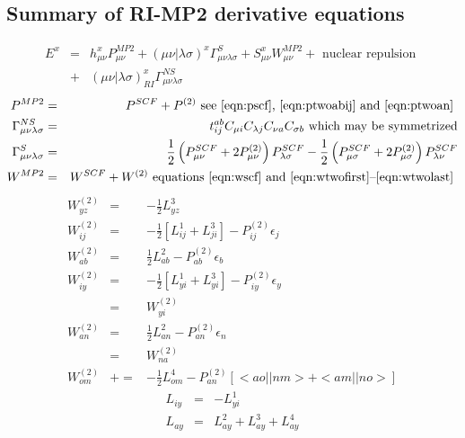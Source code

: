 \documentclass[fleqn,12pt]{article}
\newcommand{\half}{\frac{1}{2}}
\newcommand{\bra}{<\!}
\newcommand{\ket}{\!>}
\newcommand{\tijab}{{t_{ij}^{ab}}}
\newcommand{\Ptwo}{P^{(2)}}
\newcommand{\Wtwo}{W^{(2)}}
\newcommand{\intmri}[2]{( #1 | #2 )_{RI}}
\begin{document}
\begin{changebar}
\section{Summary of RI-MP2 derivative equations}
\begin{eqnarray}
  E^x & = & h^x_{\mu \nu} P^{MP2}_{\mu \nu}
     + (\mu \nu | \lambda \sigma)^x \Gamma^{S}_{\mu \nu \lambda \sigma}
     + S^x_{\mu \nu} W^{MP2}_{\mu \nu} + \mbox{ nuclear repulsion } \\
& + & \intmri{\mu\nu}{\lambda\sigma}^{x} \Gamma^{NS}_{\mu \nu \lambda
     \sigma} \nonumber
\end{eqnarray}
\begin{eqnarray}
  P^{MP2} & = & P^{SCF} + \Ptwo \mbox{ see \ref{eqn:pscf},
    \ref{eqn:ptwoabij} and \ref{eqn:ptwoan} } \\ 
  \Gamma^{NS}_{\mu \nu \lambda \sigma} & = & \tijab C_{\mu i}
  C_{\lambda j} C_{\nu a} C_{\sigma b} \mbox{ which may be
    symmetrized} \\
  \Gamma^{S}_{\mu \nu \lambda \sigma} & = &   
  \half\left(P^{SCF}_{\mu\nu} + 2 \Ptwo_{\mu\nu}\right)
  P^{SCF}_{\lambda\sigma} -  
  \half \left(P^{SCF}_{\mu\sigma} + 2 \Ptwo_{\mu\sigma}
  \right)P^{SCF}_{\lambda\nu}  \\
  W^{MP2} & = & W^{SCF} + \Wtwo \mbox{ equations \ref{eqn:wscf} and
    \ref{eqn:wtwofirst}--\ref{eqn:wtwolast} }
\end{eqnarray}
\begin{eqnarray}
  \Wtwo_{yz} & = & -\half L^3_{yz} \\
  \Wtwo_{ij} & = & -\half \left[ L^1_{ij} + L^3_{ji} \right]  -
  \Ptwo_{ij} \epsilon_j   \\
  \Wtwo_{ab} & = & \half L^2_{ab} - \Ptwo_{ab} \epsilon_b \\
  \Wtwo_{iy} & = & -\half\left[ L^1_{yi} + L^3_{yi} \right] -
  \Ptwo_{iy} \epsilon_y  \\
         & = & \Wtwo_{yi} \\
  \Wtwo_{an} & = & \half L^2_{an} - \Ptwo_{an} \epsilon_n \\
         & = & \Wtwo_{na} \\
  \Wtwo_{om} & += & -\half L^4_{om}  - \Ptwo_{an} \left[ \bra ao||nm \ket
    + \bra am||no \ket \right]
\end{eqnarray}
\begin{eqnarray}
  L_{iy} & = & -L^1_{yi} \\
  L_{ay} & = & L^2_{ay} + L^3_{ay} + L^4_{ay} \\

\end{eqnarray}
\end{changebar}
\end{document}
